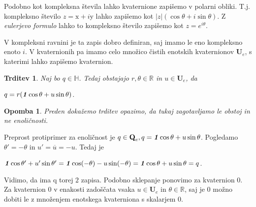 \documentclass[a4paper,12pt]{article}
\def\R{\mathbb{R}} %
\def\H{\mathbb{H}} %
\def\Qe{\textbf{Q}_{e}} %
\def\Ue{\textbf{U}_{e}} %
\def\1{\textbf{\emph{1}}}
\newcommand{\conj}[1]{\overline{#1}}
\newtheorem{trditev}{Trditev}
\newtheorem{opomba}{Opomba}
\begin{document}
Podobno kot kompleksna števila lahko kvaternione zapišemo v polarni obliki. T.j.
kompleksno število $z = \text{x} + i\text{y}$ lahko zapišemo kot $|z|( \cos\theta + i\sin\theta )$. Z \emph{eulerjevo formulo} lahko to kompleksno število
zapišemo kot $z = e^{i\theta}$.

V kompleksni ravnini je ta zapis dobro definiran, saj imamo le eno kompleksno enoto $i$.
V kvaternionih pa imamo celo množico čistih enotskih kvaternionov $\Ue$, s katerimi lahko zapišemo kvaternion.

\begin{trditev}
Naj bo $q \in \H$. Tedaj obstajajo $r, \theta \in \R$ in $u \in \Ue$, da
\begin{center}
   $q = r (\1\cos\theta + u\sin\theta)$.
\end{center}
\end{trditev}

\begin{opomba}
Preden dokažemo trditev opazimo, da tukaj zagotavljamo \emph{le obstoj} in ne enoličnosti.

\end{opomba}
Preprost protiprimer za enoličnost je $q \in \Qe, q = \1\cos\theta + u\sin\theta$.
Pogledamo $\theta' = -\theta$ in $u' = \conj{u} = -u$. Tedaj je
\begin{center}
   $\1\cos\theta' + u'\sin\theta' = \1\cos(-\theta) -u\sin(-\theta) = \1\cos\theta + u\sin\theta = q$.
\end{center}
Vidimo, da ima q torej $2$ zapisa. Podobno sklepanje ponovimo za kvaternion 0. Za kvaternion 0 v enakosti zadoščata vsaka $u \in \Ue$ in $\theta \in \R$, saj je 0 možno dobiti le z množenjem enotskega kvaterniona
s skalarjem 0.



\end{document}

